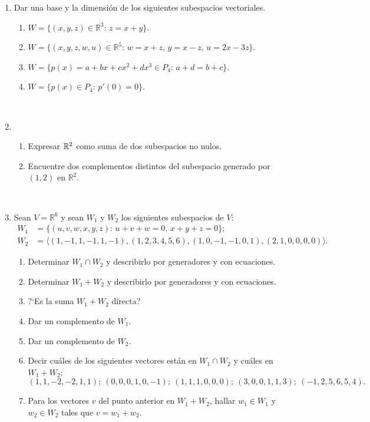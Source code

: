 \documentclass[12pt,spanish,makeidx]{amsbook}
\newcommand\R{\mathbb{R}}
\newcommand \gen[1] {\langle #1 \rangle}
\begin{document}
\begin{enumerate}
		\
			
		\item  Dar una base y la dimensi\'on de los siguientes subespacios vectoriales.
		\begin{enumerate}
			\item $W=\{(x,y,z) \in \R^3 :\, z = x + y \}$.
			\item $W = \{(x,y,z,w,u) \in \R^5 :\, w = x + z,\, y = x - z,\, u = 2x - 3z \}$.
			\item $W = \{ p(x)=a+bx+cx^2+dx^3\in P_4:\, a+d=b+c \}$.
			\item $W= \{ p(x)\in P_4:\, p'(0)=0 \}$.
		\end{enumerate}
			
		\
		
	\item
	\begin{enumerate}
		\item
		Expresar ${\Bbb R}^2$ como suma de dos subespacios no nulos.
		\item
		Encuentre dos complementos distintos del subespacio generado por $(1,2)$ en ${\R}^2$.
	\end{enumerate}
		
	\
	
	\item Sean $V=\R^6$ y sean $W_1$ y $W_2$ los siguientes subespacios de $V$:
	\begin{align*}
	W_1 &= \{ (u,v,w,x,y,z):\, u+v+w=0,\, x+y+z=0\};  \\
	W_2 &= \gen{(1,-1,1,-1,1,-1),(1,2,3,4,5,6),(1,0,-1,-1,0,1),(2,1,0,0,0,0)}.
	\end{align*}
	\begin{enumerate}
		\item  Determinar $W_1 \cap W_2$ y describirlo por generadores y con ecuaciones.
		\item  Determinar $W_1+W_2$ y describirlo por generadores y con ecuaciones.
		\item  ?`Es la suma $W_1+W_2$ directa?
		\item  Dar un complemento de $W_1$.
		\item  Dar un complemento de $W_2$.
		\item  Decir cu\'ales de los siguientes vectores est\'an en $W_1\cap W_2$ y cu\'ales en $W_1+W_2$:
		\[ (1,1,-2,-2,1,1);\ (0,0,0,1,0,-1);\ (1,1,1,0,0,0);\ (3,0,0,1,1,3);\ (-1,2,5,6,5,4). \]
		\item Para los vectores $v$ del punto anterior en $W_1+W_2$,  hallar $w_1\in W_1$ y $w_2\in W_2$ tales que $v=w_1+w_2$.
	\end{enumerate}
		

\end{enumerate}
\end{document}
